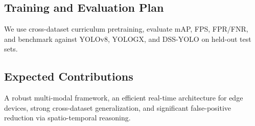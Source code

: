 \documentclass[12pt,a4paper]{article}
\begin{document}
\subsection{Training and Evaluation Plan}
We use cross-dataset curriculum pretraining, evaluate mAP, FPS, FPR/FNR, and benchmark against YOLOv8, YOLOGX, and DSS-YOLO on held-out test sets.

\subsection{Expected Contributions}
A robust multi-modal framework, an efficient real-time architecture for edge devices, strong cross-dataset generalization, and significant false-positive reduction via spatio-temporal reasoning.


\end{document}
